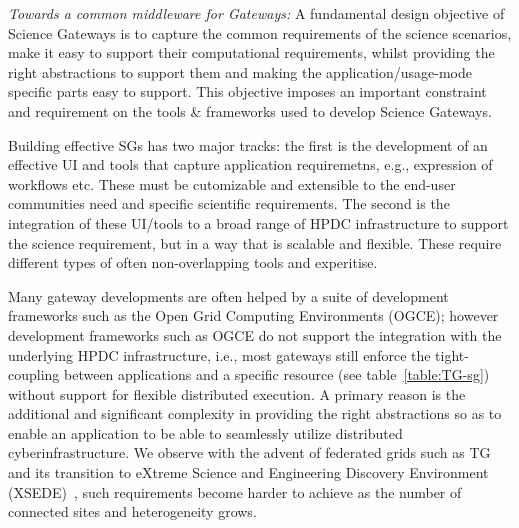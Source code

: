 \documentclass[]{svjour3}
\begin{document}
{\it Towards a common middleware for Gateways:} A fundamental design
objective of Science Gateways is to capture the common requirements of
the science scenarios, make it easy to support their computational
requirements, whilst providing the right abstractions to support them
and making the application/usage-mode specific parts easy to support.
This objective imposes an important constraint and requirement on the
tools \& frameworks used to develop Science Gateways. 


Building effective SGs has two major tracks: the first is the
development of an effective UI and tools that capture application
requiremetns, e.g., expression of workflows etc.  These must be
cutomizable and extensible to the end-user communities need and
specific scientific requirements. The second is the integration of
these UI/tools to a broad range of HPDC infrastructure to support the
science requirement, but in a way that is scalable and flexible. These
require different types of often non-overlapping tools and experitise.

Many gateway developments are often helped by a suite of development
frameworks such as the Open Grid Computing
Environments\cite{ogce-2010} (OGCE); however development frameworks
such as OGCE do not support the integration with the underlying HPDC
infrastructure, i.e., most gateways still enforce the tight-coupling
between applications and a specific resource (see
table~\ref{table:TG-sg}) without support for flexible distributed
execution.  A primary reason is the additional and significant
complexity in providing the right abstractions so as to enable an
application to be able to seamlessly utilize distributed
cyberinfrastructure.  We observe with the advent of federated grids
such as TG and its transition to eXtreme Science and Engineering
Discovery Environment (XSEDE)~\cite{XSEDE}, such requirements become
harder to achieve as the number of connected sites and heterogeneity
grows.


\end{document}
